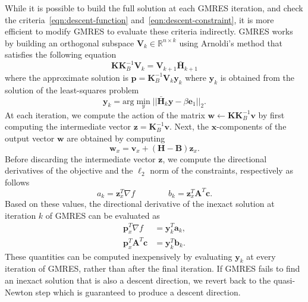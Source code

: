 \documentclass[12pt]{article}
\newcommand{\mb}{\mathbf}
\begin{document}
While it is possible to build the full solution at each GMRES iteration, and check the criteria~\eqref{eqn:descent-function} and~\eqref{eqn:descent-constraint}, it is more efficient to modify GMRES to evaluate these criteria indirectly.
GMRES works by building an orthogonal subspace $\mb{V}_{k} \in \mathbb{R}^{n \times k}$ using Arnoldi's method that satisfies the following equation
\begin{equation*}
  \mb{K}\mb{K}_{B}^{-1}\mb{V}_{k} = \mb{V}_{k+1} \bar{\mb{H}}_{k+1}
\end{equation*}
where the approximate solution is $\mb{p} = \mb{K}_{B}^{-1}\mb{V}_{k} \mb{y}_{k}$ where $\mb{y}_{k}$ is obtained from the solution of the least-squares problem
\begin{equation*}
  \mb{y}_{k} = \text{arg} \min_{y} || \bar{\mb{H}}_{k} \mb{y} - \beta \mb{e}_{1} ||_{2}.
\end{equation*}
At each iteration, we compute the action of the matrix $\mb{w} \leftarrow \mb{K}\mb{K}_{B}^{-1}\mb{v}$ by first computing the intermediate vector $\mb{z} = \mb{K}_{B}^{-1} \mb{v}$.
Next, the $\mb{x}$-components of the output vector $\mb{w}$ are obtained by computing
%
\begin{equation*}
  \mb{w}_{x} = \mb{v}_{x} + (\mb{H} - \mb{B})\mb{z}_{x}.
\end{equation*}
Before discarding the intermediate vector $\mb{z}$, we compute the directional derivatives of the objective and the $\ell_{2}$ norm of the constraints, respectively as follows
\begin{equation*}
  a_{k} = \mb{z}_{x}^{T} \nabla f \qquad\qquad b_{k} = \mb{z}_{x}^{T} \mb{A}^{T} \mb{c}.
\end{equation*}
%
Based on these values, the directional derivative of the inexact solution at iteration $k$ of GMRES can be evaluated as
\begin{equation*}
  \begin{aligned}
    \mb{p}_{x}^{T} \nabla f &= \mb{y}_{k}^{T}\mb{a}_{k}, \\
    \mb{p}_{x}^{T} \mb{A}^{T} \mb{c} &= \mb{y}_{k}^{T}\mb{b}_{k}.
  \end{aligned}
\end{equation*}
%
These quantities can be computed inexpensively by evaluating $\mb{y}_{k}$ at every iteration of GMRES, rather than after the final iteration.
If GMRES fails to find an inexact solution that is also a descent direction, we revert back to the quasi-Newton step which is guaranteed to produce a descent direction.
\end{document}
